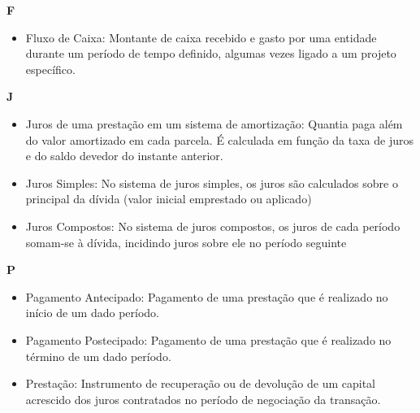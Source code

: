 \textbf{F}
\begin{itemize}
 \item Fluxo de Caixa:
    Montante de caixa recebido e gasto por uma entidade durante um período de tempo definido, algumas vezes ligado a um projeto específico. 
\end{itemize}

\textbf{J}
\begin{itemize}
 \item Juros de uma prestação em um sistema de amortização:
    Quantia paga além do valor amortizado em cada parcela. É calculada em função da taxa de juros e do saldo devedor do instante anterior. 

\item Juros Simples:
    No sistema de juros simples, os juros são calculados sobre o principal da dívida (valor inicial emprestado ou aplicado) 

\item Juros Compostos:
    No sistema de juros compostos, os juros de cada período somam-se à dívida, incidindo juros sobre ele no período seguinte 
\end{itemize}

\textbf{P}
\begin{itemize}
 \item Pagamento Antecipado:
Pagamento de uma prestação que é realizado no início de um dado período.

\item Pagamento Postecipado:
Pagamento de uma prestação que é realizado no término de um dado período.

\item Prestação:
    Instrumento de recuperação ou de devolução de um capital acrescido dos juros contratados no período de negociação da transação. 
\end{itemize}

